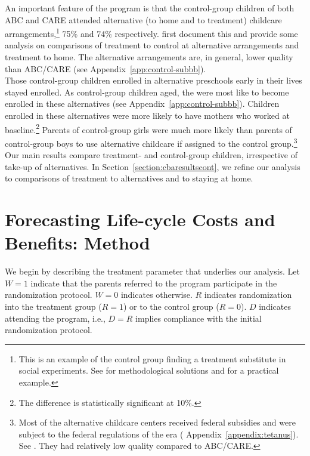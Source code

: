\noindent An important feature of the program is that the control-group children of both ABC and CARE attended alternative (to home and to treatment) childcare arrangements,\footnote{This is an example of the control group finding a treatment substitute in social experiments. See \cite{Heckman_Hohmann_etal_2000_QJE} for methodological solutions and for a practical example.} 75\% and 74\% respectively. \citet{Burchinal_etal_1989_CD_Daycare-Pre-K-Dev} first document this and provide some analysis on comparisons of treatment to control at alternative arrangements and treatment to home. The alternative arrangements are, in general, lower quality than ABC/CARE (see  Appendix~\ref{app:control-subbb}).\\

\noindent Those control-group children enrolled in alternative preschools early in their lives stayed enrolled. As control-group children aged, the were most like to become enrolled in these alternatives (see  Appendix~\ref{app:control-subbb}). Children enrolled in these alternatives were more likely to have mothers who worked at baseline.\footnote{The difference is statistically significant at 10\%.} Parents of control-group girls were much more likely than parents of control-group boys to use alternative childcare if assigned to the control group.\footnote{Most of the alternative childcare centers received federal subsidies and were subject to the federal regulations of the era ( Appendix~\ref{appendix:tetanus}). See \citet{Department-of-Health_1968_DayCareRequirements,NCGA_1971_House-Bill-100,Ramey-et-al_1977_Intro-to-ABC,Ramey_Campbell_1979_SR,Ramey_McGinness_etal_1982_Abecedarianapproach, Burchinal_Campbell_etal_1997_CD}. They had relatively low quality compared to ABC/CARE.} Our main results compare treatment- and control-group children, irrespective of take-up of alternatives. In Section~\ref{section:cbaresultscont}, we refine our analysis to comparisons of treatment to alternatives and to staying at home.

\section{Forecasting Life-cycle Costs and Benefits: Method} \label{section:cbamethodology}

\noindent We begin by describing the treatment parameter that underlies our analysis. Let $W=1$ indicate that the parents referred to the program participate in the randomization protocol. $W=0$ indicates otherwise. $R$ indicates randomization into the treatment group ($R = 1$) or to the control group ($R = 0$). $D$ indicates attending the program, i.e., $D = R$ implies compliance with the initial randomization protocol.\\


